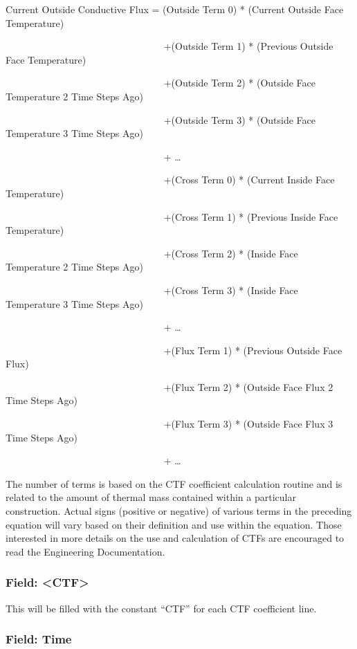 Current Outside Conductive Flux = (Outside Term 0) * (Current Outside Face Temperature)

~~~~~~~~~~~~~~~~~~~~~~~~~~~~~~~~ +(Outside Term 1) * (Previous Outside Face Temperature)

~~~~~~~~~~~~~~~~~~~~~~~~~~~~~~~~ +(Outside Term 2) * (Outside Face Temperature 2 Time Steps Ago)

~~~~~~~~~~~~~~~~~~~~~~~~~~~~~~~~ +(Outside Term 3) * (Outside Face Temperature 3 Time Steps Ago)

~~~~~~~~~~~~~~~~~~~~~~~~~~~~~~~~ + \ldots{}

~~~~~~~~~~~~~~~~~~~~~~~~~~~~~~~~ +(Cross Term 0) * (Current Inside Face Temperature)

~~~~~~~~~~~~~~~~~~~~~~~~~~~~~~~~ +(Cross Term 1) * (Previous Inside Face Temperature)

~~~~~~~~~~~~~~~~~~~~~~~~~~~~~~~~ +(Cross Term 2) * (Inside Face Temperature 2 Time Steps Ago)

~~~~~~~~~~~~~~~~~~~~~~~~~~~~~~~~ +(Cross Term 3) * (Inside Face Temperature 3 Time Steps Ago)

~~~~~~~~~~~~~~~~~~~~~~~~~~~~~~~~ + \ldots{}

~~~~~~~~~~~~~~~~~~~~~~~~~~~~~~~~ +(Flux Term 1) * (Previous Outside Face Flux)

~~~~~~~~~~~~~~~~~~~~~~~~~~~~~~~~ +(Flux Term 2) * (Outside Face Flux 2 Time Steps Ago)

~~~~~~~~~~~~~~~~~~~~~~~~~~~~~~~~ +(Flux Term 3) * (Outside Face Flux 3 Time Steps Ago)

~~~~~~~~~~~~~~~~~~~~~~~~~~~~~~~~ + \ldots{}

The number of terms is based on the CTF coefficient calculation routine and is related to the amount of thermal mass contained within a particular construction. Actual signs (positive or negative) of various terms in the preceding equation will vary based on their definition and use within the equation. Those interested in more details on the use and calculation of CTFs are encouraged to read the Engineering Documentation.

\subsubsection{Field: \textless{}CTF\textgreater{}}\label{field-ctf}

This will be filled with the constant ``CTF'' for each CTF coefficient line.

\subsubsection{Field: Time}\label{field-time}

